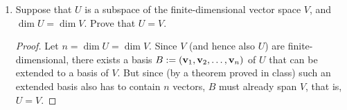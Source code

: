 \documentclass[11pt]{amsart}
\begin{document}
\begin{enumerate}[(1)]
\begin{proof}
To prove $S_1 \subseteq \spn(S_2)$, we need to show that $x^k \in \spn(S_2)$ for any $0 \le k \le n$.
We will prove this by induction on $n$.
The base case is $n=0$: $1 \in \spn \left\{ \binom x 0 \right\} = \spn \left\{ 1 \right\}$.
For the induction step, assume that $x^j \in \spn \left( \binom x 0 , \binom x 1 , \dots, \binom x {n-1} \right)$ for any $0 \le j \le n-1$.
Now given $0 \le k \le n$, if $k \ne n$ then $x^k \in \spn \left( \binom x 0 , \binom x 1 , \dots, \binom x n \right)$ by induction hypothesis.
If $k = n$ then we use the fact that
\[
  \binom x n = \frac{ 1 }{ n! } \, x^n + p(x)
\]
for some polynomial of degree $n-1$. Thus
\[
  x^n = n! \binom x n + n! \, p(x)
\]
and the last summand can be written as a linear combination of $\binom x 0 , \binom x 1 , \dots, \binom x {n-1}$, by induction hypothesis.
This gives a linear combination for $x^n$ in terms of $\binom x 0 , \binom x 1 , \dots, \binom x n$.
\end{proof}

\item Suppose that $U$ is a subspace of the finite-dimensional vector space $V$, and $\dim U = \dim V$. Prove that $U = V$.

\begin{proof}
Let $n = \dim U = \dim V$.
Since $V$ (and hence also $U$) are finite-dimensional, there exists a basis $B := \left( \mathbf{v}_1, \mathbf{v}_2, \dots, \mathbf{v}_n \right)$ of $U$ that can be extended to a basis of $V$. But since (by a theorem proved in class) such an extended basis also has to contain $n$ vectors, $B$ must already span $V$, that is, $U = V$.
\end{proof}

\end{enumerate}
\end{document}
